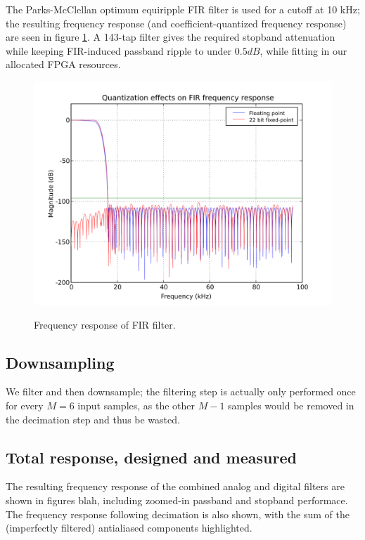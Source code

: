 The Parks-McClellan optimum equiripple FIR filter is used for a cutoff
at 10 kHz; the resulting frequency response (and coefficient-quantized
frequency response) are seen in figure \ref{FIR}. A 143-tap filter
gives the required stopband attenuation while keeping FIR-induced
passband ripple to under $0.5 dB$, while fitting in our allocated FPGA
resources.

\begin{figure}[h!]
  \includegraphics[scale=1.0]{soma-1.digital.quant.svg}
  \label{FIR}
  \caption{Frequency response of FIR filter.}
\end{figure}

\subsection{Downsampling}
We filter and then downsample; the filtering step is actually only
performed once for every $M=6$ input samples, as the other $M-1$
samples would be removed in the decimation step and thus be wasted.

\subsection{Total response, designed and measured}
The resulting frequency response of the combined analog and digital
filters are shown in figures blah, including zoomed-in passband and
stopband performace. The frequency response following decimation is
also shown, with the sum of the (imperfectly filtered) antialiased
components highlighted.

